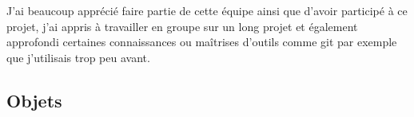 \documentclass{article}
\begin{document}
J'ai beaucoup apprécié faire partie de cette équipe ainsi que d'avoir participé à ce projet, j'ai appris à travailler en groupe sur un long projet et également approfondi certaines connaissances ou maîtrises d'outils comme git par exemple que j'utilisais trop peu avant.


















































\newpage
\subsection{Objets}
\end{document}
